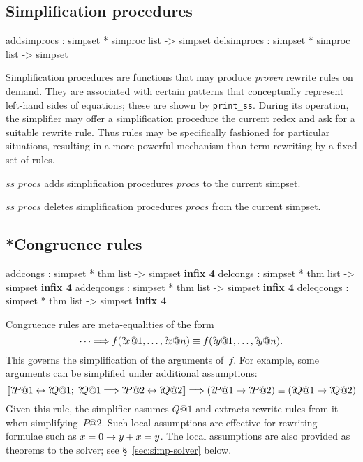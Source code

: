 \subsection{Simplification procedures}
\begin{ttbox}
addsimprocs : simpset * simproc list -> simpset
delsimprocs : simpset * simproc list -> simpset
\end{ttbox}

Simplification procedures are {\ML} functions that may produce
\emph{proven} rewrite rules on demand.  They are associated with
certain patterns that conceptually represent left-hand sides of
equations; these are shown by \texttt{print_ss}.  During its
operation, the simplifier may offer a simplification procedure the
current redex and ask for a suitable rewrite rule.  Thus rules may be
specifically fashioned for particular situations, resulting in a more
powerful mechanism than term rewriting by a fixed set of rules.


\begin{ttdescription}
  
\item[$ss$ \ttindexbold{addsimprocs} $procs$] adds simplification
  procedures $procs$ to the current simpset.
  
\item[$ss$ \ttindexbold{delsimprocs} $procs$] deletes simplification
  procedures $procs$ from the current simpset.

\end{ttdescription}


\subsection{*Congruence rules}\label{sec:simp-congs}
\begin{ttbox}
addcongs   : simpset * thm list -> simpset \hfill{\bf infix 4}
delcongs   : simpset * thm list -> simpset \hfill{\bf infix 4}
addeqcongs : simpset * thm list -> simpset \hfill{\bf infix 4}
deleqcongs : simpset * thm list -> simpset \hfill{\bf infix 4}
\end{ttbox}

Congruence rules are meta-equalities of the form
\[ \dots \Longrightarrow
   f({?\!x@1},\ldots,{?\!x@n}) \equiv f({?\!y@1},\ldots,{?\!y@n}).
\]
This governs the simplification of the arguments of~$f$.  For
example, some arguments can be simplified under additional assumptions:
\[ \List{\Var{P@1} \bimp \Var{Q@1};\; \Var{Q@1} \Imp \Var{P@2} \bimp \Var{Q@2}}
   \Imp (\Var{P@1} \imp \Var{P@2}) \equiv (\Var{Q@1} \imp \Var{Q@2})
\]
Given this rule, the simplifier assumes $Q@1$ and extracts rewrite
rules from it when simplifying~$P@2$.  Such local assumptions are
effective for rewriting formulae such as $x=0\rightarrow y+x=y$.  The local
assumptions are also provided as theorems to the solver; see
\S~\ref{sec:simp-solver} below.

